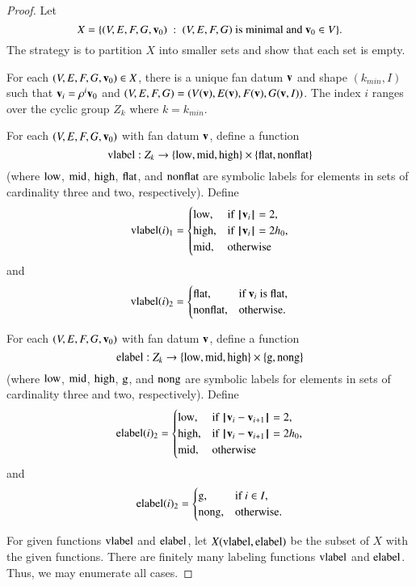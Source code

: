 \begin{proof}  
Let 
$$X= \{(V,E,F,G,\v_0) \mid  (V,E,F,G) \text{ is minimal and } \v_0\in V\}.
$$  The strategy is to partition $X$ into smaller sets and show that each set is empty.

For each $(V,E,F,G,\v_0)\in X$, there is a unique fan datum $\v$ and shape $(k_{min},I)$ such
that $\v_i = \rho^i\v_0$ and $(V,E,F,G) = (V(\v),E(\v),F(\v),G(\v,I))$.  The index $i$ ranges over the cyclic group $Z_k$ where $k=k_{min}$.  

For each $(V,E,F,G,\v_0)$ with fan datum $\v$, define a function
$$
\op{vlabel}:Z_k \to \{\op{low},\op{mid},\op{high}\} \times \{\op{flat},\op{nonflat}\}
$$
(where $\op{low}$, $\op{mid}$, $\op{high}$, $\op{flat}$, and $\op{nonflat}$ are symbolic labels for elements in sets of cardinality three and two, respectively).
Define
$$
\op{vlabel}(i)_1 = \begin{cases}
   \op{low}, &\text{if } \normo{\v_i} = 2,\\
   \op{high}, &\text{if } \normo{\v_i} = 2\hm,\\
   \op{mid}, &\text{otherwise}
\end{cases}
$$
and
$$
\op{vlabel}(i)_2 = \begin{cases}
   \op{flat}, &\text{if $\v_i$ is flat},\\
   \op{nonflat}, &\text{otherwise}.
\end{cases}
$$

For each $(V,E,F,G,\v_0)$ with fan datum $\v$, define a function
$$
\op{elabel}:Z_k \to \{\op{low},\op{mid},\op{high}\} \times \{\op{g},\op{nong}\}
$$
(where $\op{low}$, $\op{mid}$, $\op{high}$, $\op{g}$, and $\op{nong}$ are symbolic labels for elements in sets of cardinality three and two, respectively).
Define
$$
\op{elabel}(i)_2 = \begin{cases}
   \op{low}, &\text{if } \norm{\v_i}{\v_{i+1}} = 2,\\
   \op{high}, &\text{if } \norm{\v_i}{\v_{i+1}} = 2\hm,\\
   \op{mid}, &\text{otherwise}
\end{cases}
$$
and
$$
\op{elabel}(i)_2 = \begin{cases}
   \op{g}, &\text{if $i\in I$},\\
   \op{nong}, &\text{otherwise}.
\end{cases}
$$

For given functions $\op{vlabel}$ and $\op{elabel}$, 
let $X(\op{vlabel},\op{elabel})$ be the subset of $X$ with the given functions.
There are finitely many labeling functions $\op{vlabel}$ and $\op{elabel}$.
Thus, we may enumerate all cases.


\end{proof}
